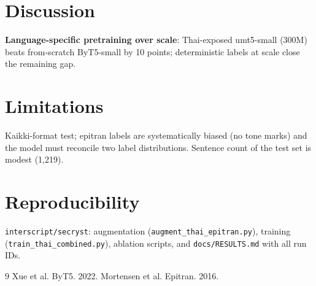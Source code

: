\documentclass[11pt]{article}
\begin{document}
\section{Discussion}
\textbf{Language-specific pretraining over scale}: Thai-exposed
umt5-small (300M) beats from-scratch ByT5-small by 10 points;
deterministic labels at scale close the remaining gap.

\section{Limitations}
Kaikki-format test; epitran labels are systematically biased (no tone
marks) and the model must reconcile two label distributions. Sentence
count of the test set is modest (1,219).

\section{Reproducibility}
\texttt{interscript/secryst}: augmentation
(\texttt{augment\_thai\_epitran.py}), training
(\texttt{train\_thai\_combined.py}), ablation scripts, and
\texttt{docs/RESULTS.md} with all run IDs.

\begin{thebibliography}{9}
 Xue et al. ByT5. 2022.
 Mortensen et al. Epitran. 2016.
\end{thebibliography}
\end{document}
